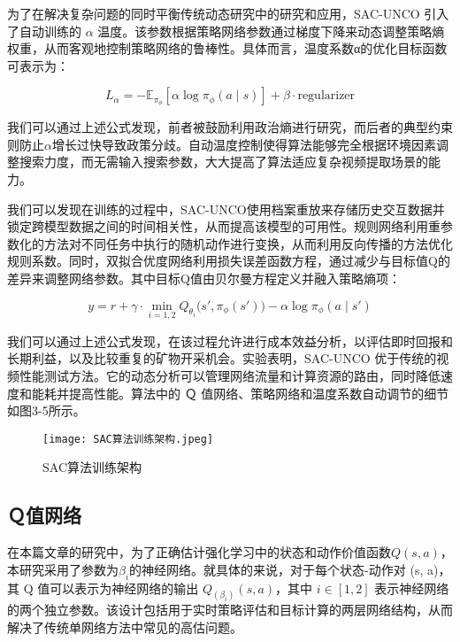 为了在解决复杂问题的同时平衡传统动态研究中的研究和应用，SAC-UNCO 引入了自动训练的 \(α\) 温度。该参数根据策略网络参数通过梯度下降来动态调整策略熵权重，从而客观地控制策略网络的鲁棒性。具体而言，温度系数α的优化目标函数可表示为：

\begin{equation}
	L_{\alpha} = -\mathbb{E}_{\pi_{\phi}} \left[ \alpha \log \pi_{\phi}(a \mid s) \right] + \beta \cdot \text{regularizer}
\end{equation}

我们可以通过上述公式发现，前者被鼓励利用政治熵进行研究，而后者的典型约束则防止\(α\)增长过快导致政策分歧。自动温度控制使得算法能够完全根据环境因素调整搜索力度，而无需输入搜索参数，大大提高了算法适应复杂视频提取场景的能力。

我们可以发现在训练的过程中，SAC-UNCO使用档案重放来存储历史交互数据并锁定跨模型数据之间的时间相关性，从而提高该模型的可用性。规则网络利用重参数化的方法对不同任务中执行的随机动作进行变换，从而利用反向传播的方法优化规则系数。同时，双拟合优度网络利用损失误差函数方程，通过减少与目标值Q的差异来调整网络参数。其中目标Q值由贝尔曼方程定义并融入策略熵项：

\begin{equation}
	y = r + \gamma \cdot \min_{i=1,2} Q_{\theta_i}\big(s', \pi_\phi(s')\big) - \alpha \log \pi_\phi(a \mid s')
\end{equation}

我们可以通过上述公式发现，在该过程允许进行成本效益分析，以评估即时回报和长期利益，以及比较重复的矿物开采机会。实验表明，SAC-UNCO 优于传统的视频性能测试方法。它的动态分析可以管理网络流量和计算资源的路由，同时降低速度和能耗并提高性能。算法中的 Ｑ 值网络、策略网络和温度系数自动调节的细节如图3-5所示。

\begin{figure}[hbt]
	\centering
	\texttt{[image: SAC算法训练架构.jpeg]}
	\caption{SAC算法训练架构}
	\label{f.example}
\end{figure}


\subsection{Ｑ值网络}

在本篇文章的研究中，为了正确估计强化学习中的状态和动作价值函数\(Q(s,a)\)，本研究采用了参数为\(β_i\)的神经网络。就具体的来说，对于每个状态-动作对 (s, a)，其 Q 值可以表示为神经网络的输出 \(Q_(β_i)(s, a)\)，其中 \(i∈[1,2]\) 表示神经网络的两个独立参数。该设计包括用于实时策略评估和目标计算的两层网络结构，从而解决了传统单网络方法中常见的高估问题。

